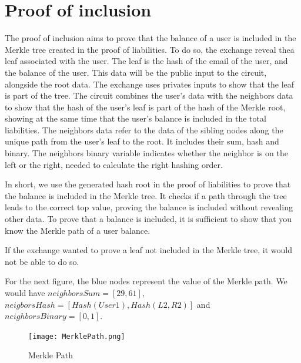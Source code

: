 \section{Proof of inclusion}
\label{subsec:pi}
The proof of inclusion aims to prove that the balance of a user is included in the Merkle tree created in the proof of liabilities.
To do so, the exchange reveal thea leaf associated with the user. The leaf is the hash of the email of the user, and the balance of the user.
This data will be the public input to the circuit, alongside the root data.
The exchange uses privates inputs to show that the leaf is part of the tree. 
The circuit combines the user's data with the neighbors data to show that the hash of the user's leaf is part of the hash of the Merkle root, showing at the same time that the user's balance is included in the total liabilities.
The neighbors data refer to the data of the sibling nodes along the unique path from the user's leaf to the root.
It includes their sum, hash and binary. The neighbors binary variable indicates whether the neighbor is on the left or the right, needed to calculate the right hashing order. 

In short, we use the generated hash root in the proof of liabilities to prove that the balance is included in the Merkle tree.
It checks if a path through the tree leads to the correct top value, proving the balance is included without revealing other data.
To prove that a balance is included, it is sufficient to show that you know the Merkle path of a user balance. 

If the exchange wanted to prove a leaf not included in the Merkle tree, it would not be able to do so. 

For the next figure, the blue nodes represent the value of the Merkle path.
We would have $neighborsSum=[29,61]$, $neigborsHash=[Hash(User1),Hash(L2,R2)]$ and $neighborsBinary=[0,1]$.
   \begin{figure}[H]
   \centering
   \texttt{[image: MerklePath.png]}
   \caption{Merkle Path}
   \label{overflow}
   \end{figure}

